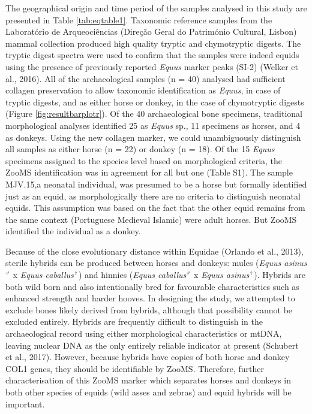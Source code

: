 \documentclass[preprint, 3p, authoryear]{elsarticle} %
\begin{document}
The geographical origin and time period of the samples analysed in this study are presented in Table \ref{tab:eqtable1}.
Taxonomic reference samples from the Laboratório de Arqueociências (Direção Geral do Património Cultural, Lisbon) mammal collection produced high quality tryptic and chymotryptic digests. The tryptic digest spectra were used to confirm that the samples were indeed equids using the presence of previously reported \emph{Equus} marker peaks (SI-2) (Welker et al., 2016). All of the archaeological samples (n = 40) analysed had sufficient collagen preservation to allow taxonomic identification as \emph{Equus}, in case of tryptic digests, and as either horse or donkey, in the case of chymotryptic digests (Figure \ref{fig:resultbarplotr}). Of the 40 archaeological bone specimens, traditional morphological analyses identified 25 as \emph{Equus} sp., 11 specimens as horses, and 4 as donkeys. Using the new collagen marker, we could unambiguously distinguish all samples as either horse (n = 22) or donkey (n = 18). Of the 15 \emph{Equus} specimens assigned to the species level based on morphological criteria, the ZooMS identification was in agreement for all but one (Table S1). The sample MJV.15,a neonatal individual, was presumed to be a horse but formally identified just as an equid, as morphologically there are no criteria to distinguish neonatal equids. This assumption was based on the fact that the other equid remains from the same context (Portuguese Medieval Islamic) were adult horses. But ZooMS identified the individual as a donkey.

Because of the close evolutionary distance within Equidae (Orlando et al., 2013), sterile hybrids can be produced between horses and donkeys: mules (\emph{Equus asinus}\(^{\male}\) x \emph{Equus caballus}\(^{\female}\)) and hinnies (\emph{Equus caballus}\(^{\male}\) x \emph{Equus asinus}\(^{\female}\)). Hybrids are both wild born and also intentionally bred for favourable characteristics such as enhanced strength and harder hooves. In designing the study, we attempted to exclude bones likely derived from hybrids, although that possibility cannot be excluded entirely. Hybrids are frequently difficult to distinguish in the archaeological record using either morphological characteristics or mtDNA, leaving nuclear DNA as the only entirely reliable indicator at present (Schubert et al., 2017). However, because hybrids have copies of both horse and donkey COL1 genes, they should be identifiable by ZooMS. Therefore, further characterisation of this ZooMS marker which separates horses and donkeys in both other species of equids (wild asses and zebras) and equid hybrids will be important.
\end{document}
